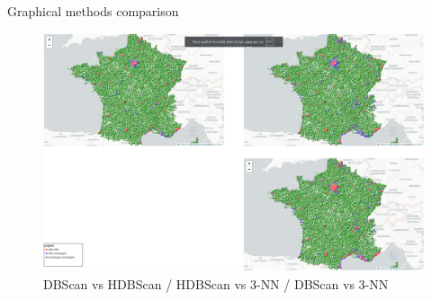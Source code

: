 \begin{frame}{Graphical methods comparison}
    \begin{figure}
        \includegraphics[height=0.6\paperheight]{images/city-detection-comparison.png}
        \caption{\label{fig:city-detection-comparison}DBScan vs HDBScan / HDBScan vs 3-NN / DBScan vs 3-NN}
    \end{figure}
\end{frame}


